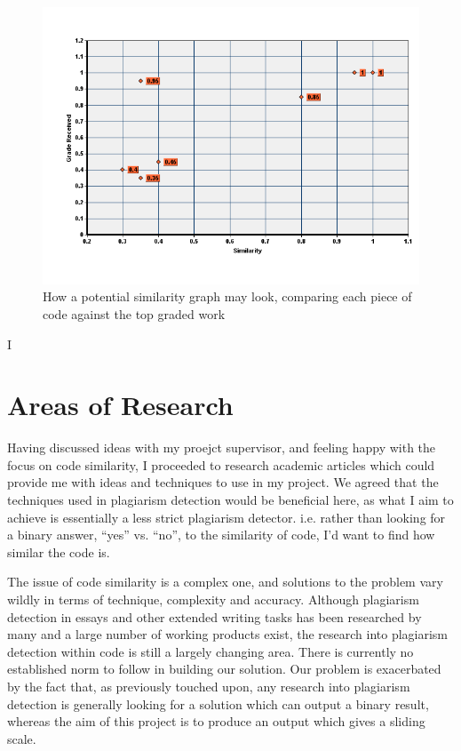\begin{figure}[h!]
	\centering
		\includegraphics[width=\textwidth]{Figures/similarityVsGradeGraph}
	\caption{How a potential similarity graph may look, comparing each piece of
	code against the top graded work}
	\label{fig:SimilarityVsGradeGraph}
\end{figure}

I





\section{Areas of Research}

Having discussed ideas with my proejct supervisor, and feeling happy with the
focus on code similarity, I proceeded to research academic articles which could
provide me with ideas and techniques to use in my project. We agreed that the
techniques used in plagiarism detection would be beneficial here, as what I aim
to achieve is essentially a less strict plagiarism detector. i.e. rather than
looking for a binary answer, ``yes'' vs. ``no'', to the similarity of code, I'd
want to find how similar the code is.

The issue of code similarity is a complex one, and solutions to the problem
vary wildly in terms of technique, complexity and accuracy. Although plagiarism
detection in essays and other extended writing tasks has been 
researched by many and a large number of working products exist, the research
into plagiarism detection within code is still a largely changing area. There
is currently no established norm to follow in building our solution. Our problem
is exacerbated by the fact that, as previously touched upon,
any research into plagiarism detection is
generally looking for a solution which can output a binary result, whereas the
aim of this project is to produce an output which gives a sliding scale.

